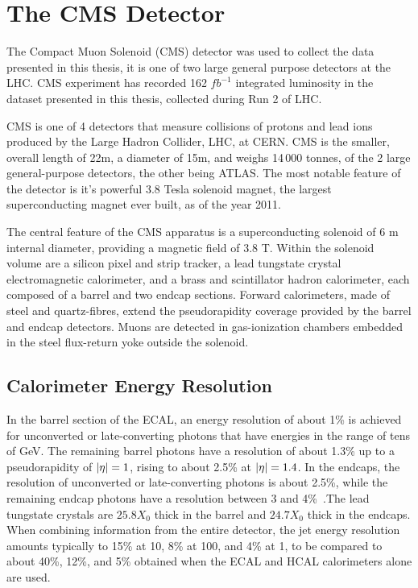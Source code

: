 \vspace{-3pt}
\section{The CMS Detector}\label{sec:CMSDetector}



The Compact Muon Solenoid (CMS) detector was used to collect the data presented in this thesis, it is one of two large general purpose detectors at the LHC. CMS experiment has recorded 162 $fb^{-1}$ integrated luminosity in the dataset presented in this thesis, collected during Run 2 of LHC.

CMS is one of 4 detectors that measure collisions of protons and lead ions produced by the Large Hadron Collider, LHC, at CERN. CMS is the smaller, overall length of 22m, a diameter of 15m, and weighs 14\,000 tonnes, of the 2 large general-purpose detectors, the other being ATLAS. The most notable feature of the detector is it's powerful 3.8 Tesla solenoid magnet, the largest superconducting magnet ever built, as of the year 2011.


The central feature of the CMS apparatus is a superconducting solenoid of 6 m internal diameter, providing a magnetic field of 3.8 T. Within the solenoid volume are a silicon pixel and strip tracker, a lead tungstate crystal electromagnetic calorimeter, and a brass and scintillator hadron calorimeter, each composed of a barrel and two endcap sections. Forward calorimeters, made of steel and quartz-fibres, extend the pseudorapidity coverage provided by the barrel and endcap detectors. Muons are detected in gas-ionization chambers embedded in the steel flux-return yoke outside the solenoid. 



\subsection{Calorimeter Energy Resolution}\label{sec:CMSDetectorCalo}

 In the barrel section of the ECAL, an energy resolution of about 1\% is achieved for unconverted or late-converting photons that have energies in the range of tens of GeV. The remaining barrel photons have a resolution of about 1.3\% up to a pseudorapidity of $\lvert \eta \rvert = 1$, rising to about 2.5\% at $\lvert \eta \rvert = 1.4$. In the endcaps, the resolution of unconverted or late-converting photons is about 2.5\%, while the remaining endcap photons have a resolution between 3 and 4\%~\cite{CMS:EGM-14-001}.The lead tungstate crystals are $25.8 X_0$ thick in the barrel and $24.7 X_0$ thick in the endcaps. When combining information from the entire detector, the jet energy resolution amounts typically to 15\% at 10\GeV, 8\% at 100\GeV, and 4\% at 1\TeV, to be compared to about 40\%, 12\%, and 5\% obtained when the ECAL and HCAL calorimeters alone are used.

